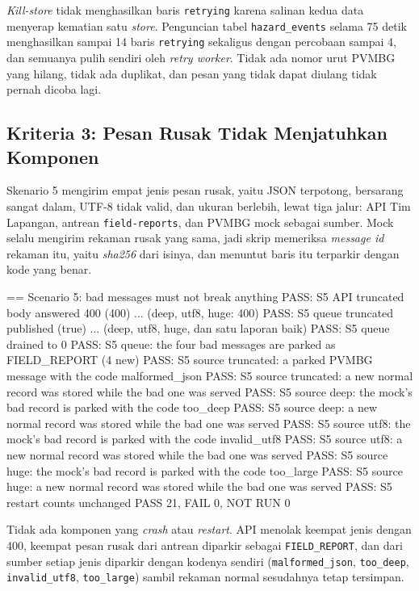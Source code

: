 \textit{Kill-store} tidak menghasilkan baris \texttt{retrying} karena salinan kedua data menyerap kematian satu \textit{store}. Penguncian tabel \texttt{hazard\_events} selama 75 detik menghasilkan sampai 14 baris \texttt{retrying} sekaligus dengan percobaan sampai 4, dan semuanya pulih sendiri oleh \textit{retry worker}. Tidak ada nomor urut PVMBG yang hilang, tidak ada duplikat, dan pesan yang tidak dapat diulang tidak pernah dicoba lagi.

\subsection{Kriteria 3: Pesan Rusak Tidak Menjatuhkan Komponen}

Skenario 5 mengirim empat jenis pesan rusak, yaitu JSON terpotong, bersarang sangat dalam, UTF-8 tidak valid, dan ukuran berlebih, lewat tiga jalur: API Tim Lapangan, antrean \texttt{field-reports}, dan PVMBG mock sebagai sumber. Mock selalu mengirim rekaman rusak yang sama, jadi skrip memeriksa \textit{message id} rekaman itu, yaitu \textit{sha256} dari isinya, dan menuntut baris itu terparkir dengan kode yang benar.

\begin{codebox}
== Scenario 5: bad messages must not break anything
PASS: S5 API truncated body answered 400 (400)  ...  (deep, utf8, huge: 400)
PASS: S5 queue truncated published (true)  ...  (deep, utf8, huge, dan satu laporan baik)
PASS: S5 queue drained to 0
PASS: S5 queue: the four bad messages are parked as FIELD_REPORT (4 new)
PASS: S5 source truncated: a parked PVMBG message with the code malformed_json
PASS: S5 source truncated: a new normal record was stored while the bad one was served
PASS: S5 source deep: the mock's bad record is parked with the code too_deep
PASS: S5 source deep: a new normal record was stored while the bad one was served
PASS: S5 source utf8: the mock's bad record is parked with the code invalid_utf8
PASS: S5 source utf8: a new normal record was stored while the bad one was served
PASS: S5 source huge: the mock's bad record is parked with the code too_large
PASS: S5 source huge: a new normal record was stored while the bad one was served
PASS: S5 restart counts unchanged
PASS 21, FAIL 0, NOT RUN 0
\end{codebox}

Tidak ada komponen yang \textit{crash} atau \textit{restart}. API menolak keempat jenis dengan 400, keempat pesan rusak dari antrean diparkir sebagai \texttt{FIELD\_REPORT}, dan dari sumber setiap jenis diparkir dengan kodenya sendiri (\texttt{malformed\_json}, \texttt{too\_deep}, \texttt{invalid\_utf8}, \texttt{too\_large}) sambil rekaman normal sesudahnya tetap tersimpan.

